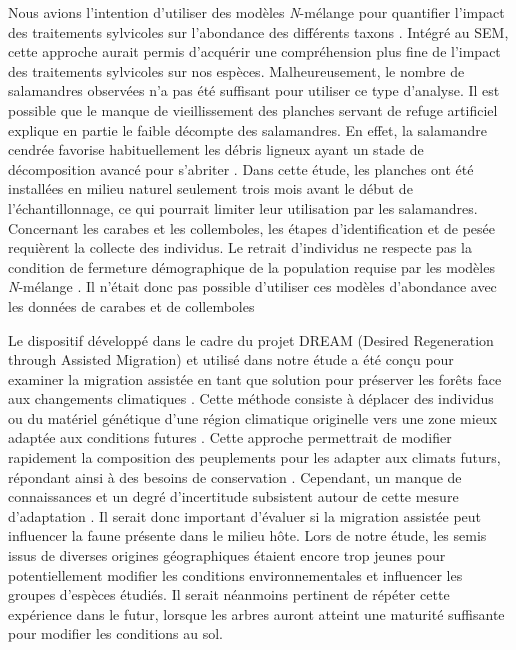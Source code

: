 Nous avions l’intention d’utiliser des modèles \textit{N}-mélange pour quantifier l'impact des traitements sylvicoles sur l'abondance des différents taxons \citep{Royle2004Nmixturemodels,Mazerolle2021Woodlandsalamander}. 
Intégré au SEM, cette approche aurait permis d'acquérir une compréhension plus fine de l'impact des traitements sylvicoles sur nos espèces. 
Malheureusement, le nombre de salamandres observées n'a pas été suffisant pour utiliser ce type d'analyse. 
Il est possible que le manque de vieillissement des planches servant de refuge artificiel explique en partie le faible décompte des salamandres. 
En effet, la salamandre cendrée favorise habituellement les débris ligneux ayant un stade de décomposition avancé pour s'abriter \citep{Otto2011ComparingCover,hedrickEffectsCoverboardAge2021}. 
Dans cette étude, les planches ont été installées en milieu naturel seulement trois mois avant le début de l'échantillonnage, ce qui pourrait limiter leur utilisation par les salamandres. 
Concernant les carabes et les collemboles, les étapes d’identification et de pesée requièrent la collecte des individus. 
Le retrait d’individus ne respecte pas la condition de fermeture démographique de la population requise par les modèles \textit{N}-mélange \citep{Royle2004Nmixturemodels}. 
Il n’était donc pas possible d’utiliser ces modèles d’abondance avec les données de carabes et de collemboles

Le dispositif développé dans le cadre du projet DREAM (Desired Regeneration through Assisted Migration) et utilisé dans notre étude a été conçu pour examiner la migration assistée en tant que solution pour préserver les forêts face aux changements climatiques \citep{royoDesiredREgenerationAssisted2023}. 
Cette méthode consiste à déplacer des individus ou du matériel génétique d’une région climatique originelle vers une zone mieux adaptée aux conditions futures \citep{Vitt2010Assistedmigration}. 
Cette approche permettrait de modifier rapidement la composition des peuplements pour les adapter aux climats futurs, répondant ainsi à des besoins de conservation \citep{Dumroese2015Considerationsrestoring,Park2018Informationunderload,Park2023Provenancetrials}. 
Cependant, un manque de connaissances et un degré d’incertitude subsistent autour de cette mesure d’adaptation \citep{Klenk2015assistedmigration,Park2018Informationunderload}. 
Il serait donc important d’évaluer si la migration assistée peut influencer la faune présente dans le milieu hôte.
Lors de notre étude, les semis issus de diverses origines géographiques étaient encore trop jeunes pour potentiellement modifier les conditions environnementales et influencer les groupes d’espèces étudiés. 
Il serait néanmoins pertinent de répéter cette expérience dans le futur, lorsque les arbres auront atteint une maturité suffisante pour modifier les conditions au sol. 


